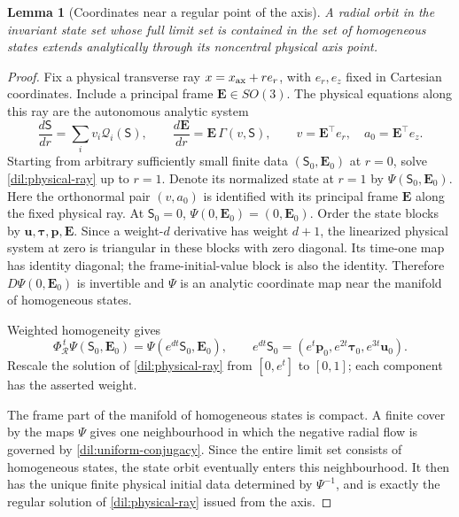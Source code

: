 \documentclass[11pt,a4paper]{article}
\numberwithin{equation}{section}
\theoremstyle{plain}
\newtheorem{lemma}[theorem]{Lemma}
\theoremstyle{definition}
\theoremstyle{remark}
\begin{document}
\begin{lemma}[Coordinates near a regular point of the axis]\label{dil:uniform-axis}
A radial orbit in the invariant state set whose full limit set is contained in the
set of homogeneous states extends analytically through its noncentral
physical axis point.
\end{lemma}
\begin{proof}
Fix a physical transverse ray $x=x_{\rm ax}+re_r$, with $e_r,e_z$
fixed in Cartesian coordinates.  Include a principal frame $\mathbf E\in SO(3)$.  The physical equations along this ray are the
autonomous analytic system
\begin{equation}\label{dil:physical-ray}
 \frac{d\mathsf S}{dr}=\sum_iv_i\mathcal Q_i(\mathsf S),\qquad
 \frac{d\mathbf E}{dr}=\mathbf E\,\Gamma(v,\mathsf S),\qquad
 v=\mathbf E^{\top}e_r,\quad a_0=\mathbf E^{\top}e_z .
\end{equation}
Starting from arbitrary sufficiently small finite data $(\mathsf S_0,\mathbf E_0)$
at $r=0$, solve \eqref{dil:physical-ray} up to $r=1$.  Denote its
normalized state at $r=1$ by $\Psi(\mathsf S_0,\mathbf E_0)$.
Here the orthonormal pair $(v,a_0)$ is identified with its principal
frame $\mathbf E$ along the fixed physical ray.
At $\mathsf S_0=0$, $\Psi(0,\mathbf E_0)=(0,\mathbf E_0)$.  Order the state blocks by
$\boldsymbol u,\boldsymbol\tau,\boldsymbol p,\mathbf E$.  Since a weight-$d$ derivative has weight $d+1$,
the linearized physical system at zero is triangular in these
blocks with zero diagonal.  Its time-one map has identity diagonal;
the frame-initial-value block is also the identity.  Therefore
$D\Psi(0,\mathbf E_0)$ is invertible and $\Psi$ is an analytic coordinate
map near the manifold of homogeneous states.

Weighted homogeneity gives
\begin{equation}\label{dil:uniform-conjugacy}
 \Phi_{\mathcal R}^{\,t}\Psi(\mathsf S_0,\mathbf E_0)
             =\Psi(e^{dt}\mathsf S_0,\mathbf E_0),
 \qquad
 e^{dt}\mathsf S_0=(e^t\boldsymbol p_0,e^{2t}\boldsymbol\tau_0,e^{3t}\boldsymbol u_0).
\end{equation}
Rescale the solution of
\eqref{dil:physical-ray} from $[0,e^t]$ to $[0,1]$; each component
has the asserted weight.  

The frame part of the manifold of homogeneous states is compact.  A finite
cover by the maps $\Psi$ gives one neighbourhood in which the
negative radial flow is governed by \eqref{dil:uniform-conjugacy}.
Since the entire limit set consists of homogeneous states, the state orbit eventually
enters this neighbourhood.  It then has the unique finite physical
initial data determined by $\Psi^{-1}$, and is exactly the regular
solution of \eqref{dil:physical-ray} issued from the axis.


\end{proof}
\end{document}
